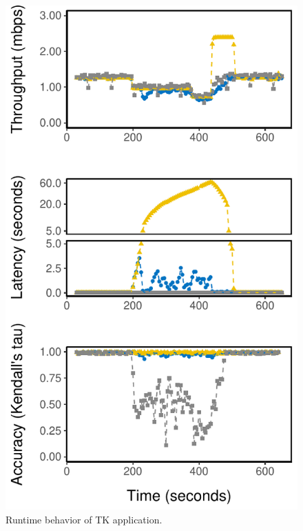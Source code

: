 \begin{figure}
  \centering
  \includegraphics[width=\columnwidth]{figures/runtime-topk-verticle.pdf}
  \caption{Runtime behavior of TK application.}
  \label{fig:tk-runtime}
\end{figure}

